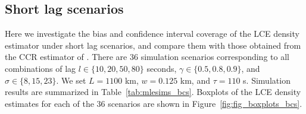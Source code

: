 \documentclass[useAMS, usenatbib, referee]{biom}\usepackage[]{graphicx}\usepackage[]{color}
\begin{document}
\subsection{Short lag scenarios}


Here we investigate the bias and confidence interval coverage of the LCE density estimator under short lag scenarios, and compare them with those obtained from the CCR estimator of \cite{Stevenson+al:19}. There are 36 simulation scenarios corresponding to all combinations of lag $l \in \{ 10, 20, 50, 80\}$ seconds,  $\gamma \in\{ 0.5, 0.8, 0.9 \}$, and $\sigma\in\{ 8, 15, 23\}$. We set $L = 1100$ km, $w = 0.125$ km, and $\tau = 110$ s. Simulation results are summarized in Table~\ref{tab:mlesims_bcs}. Boxplots of the LCE density estimates for each of the 36 scenarios are shown in Figure~\ref{fig:fig_boxplots_bcs}.

\end{document}

